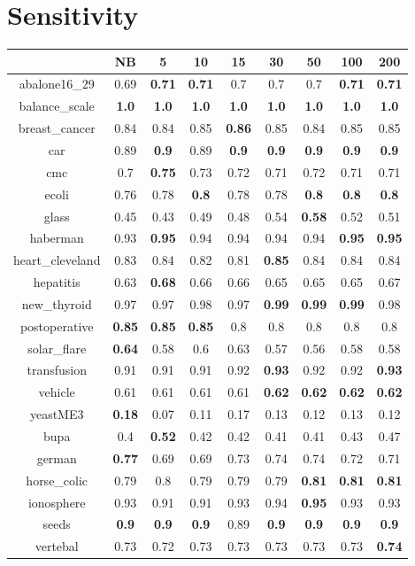 \documentclass{article}%
\begin{document}
%
\section*{Sensitivity}%
\begin{tabular}{c|cccccccc}%
\hline%
&NB&5&10&15&30&50&100&200\\%
\hline%
abalone16\_29&0.69&\textbf{0.71}&\textbf{0.71}&0.7&0.7&0.7&\textbf{0.71}&\textbf{0.71}\\%
\hline%
balance\_scale&\textbf{1.0}&\textbf{1.0}&\textbf{1.0}&\textbf{1.0}&\textbf{1.0}&\textbf{1.0}&\textbf{1.0}&\textbf{1.0}\\%
\hline%
breast\_cancer&0.84&0.84&0.85&\textbf{0.86}&0.85&0.84&0.85&0.85\\%
\hline%
car&0.89&\textbf{0.9}&0.89&\textbf{0.9}&\textbf{0.9}&\textbf{0.9}&\textbf{0.9}&\textbf{0.9}\\%
\hline%
cmc&0.7&\textbf{0.75}&0.73&0.72&0.71&0.72&0.71&0.71\\%
\hline%
ecoli&0.76&0.78&\textbf{0.8}&0.78&0.78&\textbf{0.8}&\textbf{0.8}&\textbf{0.8}\\%
\hline%
glass&0.45&0.43&0.49&0.48&0.54&\textbf{0.58}&0.52&0.51\\%
\hline%
haberman&0.93&\textbf{0.95}&0.94&0.94&0.94&0.94&\textbf{0.95}&\textbf{0.95}\\%
\hline%
heart\_cleveland&0.83&0.84&0.82&0.81&\textbf{0.85}&0.84&0.84&0.84\\%
\hline%
hepatitis&0.63&\textbf{0.68}&0.66&0.66&0.65&0.65&0.65&0.67\\%
\hline%
new\_thyroid&0.97&0.97&0.98&0.97&\textbf{0.99}&\textbf{0.99}&\textbf{0.99}&0.98\\%
\hline%
postoperative&\textbf{0.85}&\textbf{0.85}&\textbf{0.85}&0.8&0.8&0.8&0.8&0.8\\%
\hline%
solar\_flare&\textbf{0.64}&0.58&0.6&0.63&0.57&0.56&0.58&0.58\\%
\hline%
transfusion&0.91&0.91&0.91&0.92&\textbf{0.93}&0.92&0.92&\textbf{0.93}\\%
\hline%
vehicle&0.61&0.61&0.61&0.61&\textbf{0.62}&\textbf{0.62}&\textbf{0.62}&\textbf{0.62}\\%
\hline%
yeastME3&\textbf{0.18}&0.07&0.11&0.17&0.13&0.12&0.13&0.12\\%
\hline%
bupa&0.4&\textbf{0.52}&0.42&0.42&0.41&0.41&0.43&0.47\\%
\hline%
german&\textbf{0.77}&0.69&0.69&0.73&0.74&0.74&0.72&0.71\\%
\hline%
horse\_colic&0.79&0.8&0.79&0.79&0.79&\textbf{0.81}&\textbf{0.81}&\textbf{0.81}\\%
\hline%
ionosphere&0.93&0.91&0.91&0.93&0.94&\textbf{0.95}&0.93&0.93\\%
\hline%
seeds&\textbf{0.9}&\textbf{0.9}&\textbf{0.9}&0.89&\textbf{0.9}&\textbf{0.9}&\textbf{0.9}&\textbf{0.9}\\%
\hline%
vertebal&0.73&0.72&0.73&0.73&0.73&0.73&0.73&\textbf{0.74}\\%
\hline%
\end{tabular}
\end{document}

